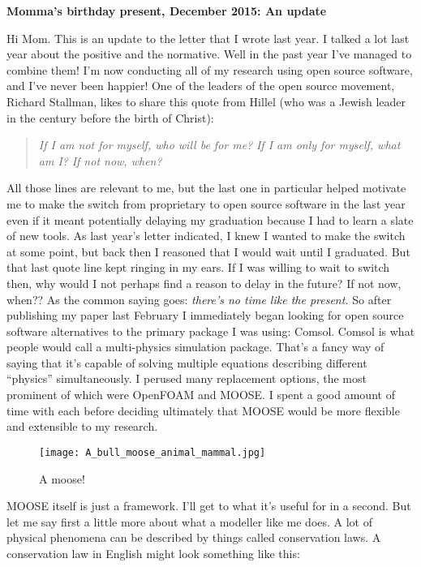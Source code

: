 \documentclass[11pt]{article}
\begin{document}
\onehalfspace
\textbf{Momma's birthday present, December 2015: An update}

Hi Mom. This is an update to the letter that I wrote last year. I talked a lot last year about the positive and the normative. Well in the past year I've managed to combine them! I'm now conducting all of my research using open source software, and I've never been happier! One of the leaders of the open source movement, Richard Stallman, likes to share this quote from Hillel (who was a Jewish leader in the century before the birth of Christ):

\begin{quotation}
\textit{If I am not for myself, who will be for me?}
\textit{If I am only for myself, what am I?}
\textit{If not now, when?}
\end{quotation}

All those lines are relevant to me, but the last one in particular helped motivate me to make the switch from proprietary to open source software in the last year even if it meant potentially delaying my graduation because I had to learn a slate of new tools. As last year's letter indicated, I knew I wanted to make the switch at some point, but back then I reasoned that I would wait until I graduated. But that last quote line kept ringing in my ears. If I was willing to wait to switch then, why would I not perhaps find a reason to delay in the future? If not now, when?? As the common saying goes: \textit{there's no time like the present.} So after publishing my paper last February I immediately began looking for open source software alternatives to the primary package I was using: Comsol. Comsol is what people would call a multi-physics simulation package. That's a fancy way of saying that it's capable of solving multiple equations describing different ``physics'' simultaneously. I perused many replacement options, the most prominent of which were OpenFOAM and MOOSE. I spent a good amount of time with each before deciding ultimately that MOOSE would be more flexible and extensible to my research. 

\begin{figure}[htpb]
    \centering
        \texttt{[image: A\_bull\_moose\_animal\_mammal.jpg]}
    \caption{A moose!}
    \label{fig:moose}
\end{figure}

MOOSE itself is just a framework. I'll get to what it's useful for in a second. But let me say first a little more about what a modeller like me does. A lot of physical phenomena can be described by things called conservation laws. A conservation law in English might look something like this:
\end{document}
